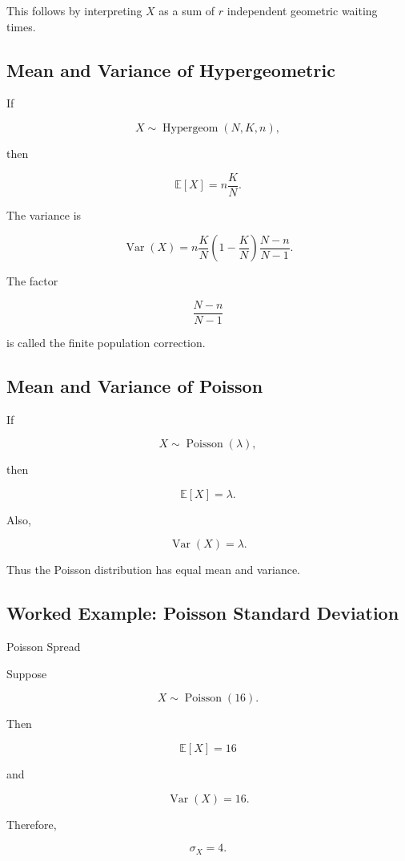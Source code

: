 This follows by interpreting \(X\) as a sum of \(r\) independent
geometric waiting times.

\subsection{Mean and Variance of Hypergeometric}
\label{subsec:hypergeometric-mean-variance}

If

\[
X
\sim
\operatorname{Hypergeom}(N,K,n),
\]

then

\[
\boxed{
\mathbb{E}[X]
=
n\frac KN.
}
\]

The variance is

\[
\boxed{
\operatorname{Var}(X)
=
n
\frac KN
\left(
1-\frac KN
\right)
\frac{N-n}{N-1}.
}
\]

The factor

\[
\boxed{
\frac{N-n}{N-1}
}
\]

is called the finite population correction.

\subsection{Mean and Variance of Poisson}
\label{subsec:poisson-mean-variance}

If

\[
X\sim\operatorname{Poisson}(\lambda),
\]

then

\[
\boxed{
\mathbb{E}[X]
=
\lambda.
}
\]

Also,

\[
\boxed{
\operatorname{Var}(X)
=
\lambda.
}
\]

Thus the Poisson distribution has equal mean and variance.

\subsection{Worked Example: Poisson Standard Deviation}
\label{subsec:worked-poisson-standard-deviation}

\begin{workedexamplebox}{Poisson Spread}

Suppose

\[
X\sim\operatorname{Poisson}(16).
\]

Then

\[
\mathbb{E}[X]=16
\]

and

\[
\operatorname{Var}(X)=16.
\]

Therefore,

\begin{answerbox}
\[
\boxed{
\sigma_X=4.
}
\]
\end{answerbox}

\end{workedexamplebox}

